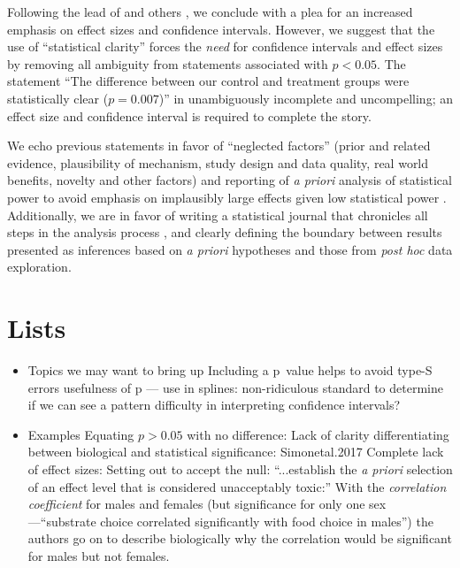 Following the lead of \citet{Cohen1994} and others \citep{Goodman1999, ZiliakandMcCloskey2008, WassersteinandLazar2016},
we conclude with a plea for an increased emphasis on effect sizes and confidence intervals. However, we suggest that the
use of ``statistical clarity'' forces the \emph{need} for confidence intervals and effect sizes by removing all ambiguity
from statements associated with $p < 0.05$. The statement ``The difference between our control and treatment groups were
statistically clear ($p = 0.007$)'' in unambiguously incomplete and uncompelling; an effect size and confidence interval 
is required to complete the story.

We echo previous statements in favor of ``neglected factors'' (prior and related evidence, plausibility of mechanism, 
study design and data quality, real world benefits, novelty and other factors) \citep{McShaneetal.2017} and 
reporting of \emph{a priori} analysis of statistical power to avoid emphasis on implausibly large effects given low 
statistical power \citep[the "winners curse"][]{GelmanandCarlin2014, SzucsandIoannidis2017, Bernardietal.2017}. 
Additionally, we are in favor of writing a statistical journal that chronicles all steps in the analysis process 
\citep{Kassetal.2016}, and clearly defining the boundary between results presented as inferences based on \emph{a priori}
hypotheses and those from \emph{post hoc} data exploration. 

\section*{Lists}

\begin{itemize}
  \item Topics we may want to bring up
	  \subitem Including a p~value helps to avoid type-S errors
      \subitem usefulness of p --- use in splines: non-ridiculous standard to determine if we can see a pattern
      \subitem difficulty in interpreting confidence intervals?
\end{itemize}

\begin{itemize}
  \item Examples
  \subitem Equating $p > 0.05$ with no difference: \citep{Ortegoetal.2007, Bukovinszkyetal.2017, Singhetal.2017, Sundinetal.2017}
  \subitem Lack of clarity differentiating between biological and statistical significance: {Simonetal.2017}
  \subitem Complete lack of effect sizes: \citep{Juriadoetal.2017}
  \subitem Setting out to accept the null: \citep{Karulinetal.2015}
  \subitem ``...establish the \emph{a priori} selection of an effect level that is considered unacceptably toxic:'' \citep{Dentonetal.2011}
  \subitem With the \emph{correlation coefficient} for males and females (but significance for only one sex---``substrate 
  choice correlated significantly with food choice in males'') the authors go on to describe biologically why the 
  correlation would be significant for males but not females. \citep{MerilaitaandJormalainen1997}
\end{itemize}

